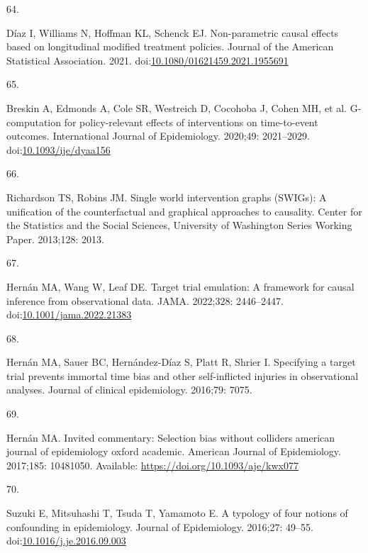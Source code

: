 \documentclass[
  singlecolumn]{article}
\newlength{\cslhangindent}
\newlength{\csllabelwidth}
\newlength{\cslentryspacingunit} %
\newenvironment{CSLReferences}[2] %
 {%
  \setlength{\parindent}{0pt}
  \ifodd #1
  \let\oldpar\par
  \def\par{\hangindent=\cslhangindent\oldpar}
  \fi
  \setlength{\parskip}{#2\cslentryspacingunit}
 }%
 {}
\newcommand{\CSLLeftMargin}[1]{\parbox[t]{\csllabelwidth}{#1}}
\newcommand{\CSLRightInline}[1]{\parbox[t]{\linewidth - \csllabelwidth}{#1}\break}
\begin{document}
\begin{CSLReferences}{0}{0}
\leavevmode{}%
\CSLLeftMargin{64. }%
\CSLRightInline{Díaz I, Williams N, Hoffman KL, Schenck EJ.
Non-parametric causal effects based on longitudinal modified treatment
policies. Journal of the American Statistical Association. 2021.
doi:\href{https://doi.org/10.1080/01621459.2021.1955691}{10.1080/01621459.2021.1955691}}

\leavevmode{}%
\CSLLeftMargin{65. }%
\CSLRightInline{Breskin A, Edmonds A, Cole SR, Westreich D, Cocohoba J,
Cohen MH, et al. G-computation for policy-relevant effects of
interventions on time-to-event outcomes. International Journal of
Epidemiology. 2020;49: 2021--2029.
doi:\href{https://doi.org/10.1093/ije/dyaa156}{10.1093/ije/dyaa156}}

\leavevmode{}%
\CSLLeftMargin{66. }%
\CSLRightInline{Richardson TS, Robins JM. Single world intervention
graphs (SWIGs): A unification of the counterfactual and graphical
approaches to causality. Center for the Statistics and the Social
Sciences, University of Washington Series Working Paper. 2013;128: 2013.
}

\leavevmode{}%
\CSLLeftMargin{67. }%
\CSLRightInline{Hernán MA, Wang W, Leaf DE. Target trial emulation: A
framework for causal inference from observational data. JAMA. 2022;328:
2446--2447.
doi:\href{https://doi.org/10.1001/jama.2022.21383}{10.1001/jama.2022.21383}}

\leavevmode{}%
\CSLLeftMargin{68. }%
\CSLRightInline{Hernán MA, Sauer BC, Hernández-Díaz S, Platt R, Shrier
I. Specifying a target trial prevents immortal time bias and other
self-inflicted injuries in observational analyses. Journal of clinical
epidemiology. 2016;79: 7075. }

\leavevmode{}%
\CSLLeftMargin{69. }%
\CSLRightInline{Hernán MA. Invited commentary: Selection bias without
colliders \textbar{} american journal of epidemiology \textbar{} oxford
academic. American Journal of Epidemiology. 2017;185: 10481050.
Available: \url{https://doi.org/10.1093/aje/kwx077}}

\leavevmode{}%
\CSLLeftMargin{70. }%
\CSLRightInline{Suzuki E, Mitsuhashi T, Tsuda T, Yamamoto E. A typology
of four notions of confounding in epidemiology. Journal of Epidemiology.
2016;27: 49--55.
doi:\href{https://doi.org/10.1016/j.je.2016.09.003}{10.1016/j.je.2016.09.003}}


\end{CSLReferences}
\end{document}
